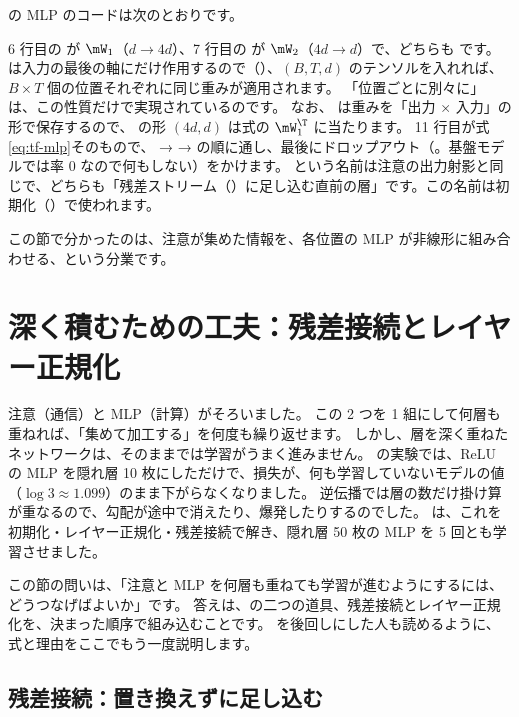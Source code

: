  の MLP のコードは次のとおりです。


6 行目の  が $\mW_1$（$d\to 4d$）、7 行目の  が $\mW_2$（$4d\to d$）で、どちらも  です。
 は入力の最後の軸にだけ作用するので（）、$(B,T,d)$ のテンソルを入れれば、$B\times T$ 個の位置それぞれに同じ重みが適用されます。
「位置ごとに別々に」は、この性質だけで実現されているのです。
なお、 は重みを「出力 × 入力」の形で保存するので、 の形 $(4d,d)$ は式の $\mW_1^\T$ に当たります。
11 行目が式\eqref{eq:tf-mlp}そのもので、 →  →  の順に通し、最後にドロップアウト（。基盤モデルでは率 0 なので何もしない）をかけます。
 という名前は注意の出力射影と同じで、どちらも「残差ストリーム（）に足し込む直前の層」です。この名前は初期化（）で使われます。

この節で分かったのは、注意が集めた情報を、各位置の MLP が非線形に組み合わせる、という分業です。

\section{深く積むための工夫：残差接続とレイヤー正規化}\label{sec:tf-residual}

注意（通信）と MLP（計算）がそろいました。
この 2 つを 1 組にして何層も重ねれば、「集めて加工する」を何度も繰り返せます。
しかし、層を深く重ねたネットワークは、そのままでは学習がうまく進みません。
の実験では、ReLU の MLP を隠れ層 10 枚にしただけで、損失が、何も学習していないモデルの値（$\log 3\approx1.099$）のまま下がらなくなりました。
逆伝播では層の数だけ掛け算が重なるので、勾配が途中で消えたり、爆発したりするのでした。
は、これを初期化・レイヤー正規化・残差接続で解き、隠れ層 50 枚の MLP を 5 回とも学習させました。

この節の問いは、「注意と MLP を何層も重ねても学習が進むようにするには、どうつなげばよいか」です。
答えは、の二つの道具、残差接続とレイヤー正規化を、決まった順序で組み込むことです。
を後回しにした人も読めるように、式と理由をここでもう一度説明します。

\subsection*{残差接続：置き換えずに足し込む}

